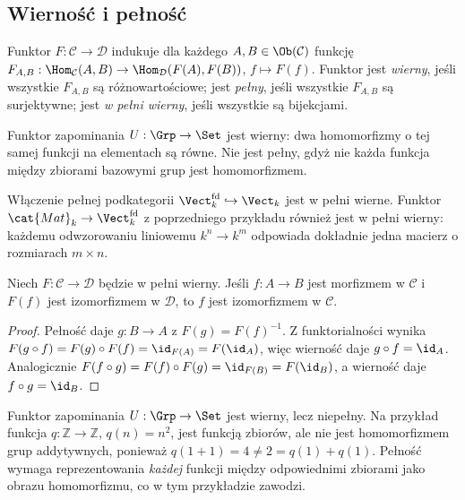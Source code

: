 \subsection{Wierność i pełność}

\begin{definicja}\label{def:pelny}
Funktor $F:\mathcal C\to\mathcal D$ indukuje dla każdego $A,B\in\Ob(\mathcal C)$ funkcję $F_{A,B}:\Hom_{\mathcal C}(A,B)\to\Hom_{\mathcal D}(F(A),F(B))$, $f\mapsto F(f)$. Funktor jest \emph{wierny}, jeśli wszystkie $F_{A,B}$ są różnowartościowe; jest \emph{pełny}, jeśli wszystkie $F_{A,B}$ są surjektywne; jest \emph{w pełni wierny}, jeśli wszystkie są bijekcjami.
\end{definicja}

\begin{przyklad}
Funktor zapominania $U:\Grp\to\Set$ jest wierny: dwa homomorfizmy o tej samej funkcji na elementach są równe. Nie jest pełny, gdyż nie każda funkcja między zbiorami bazowymi grup jest homomorfizmem.
\end{przyklad}

\begin{przyklad}
Włączenie pełnej podkategorii $\Vect_k^{\mathrm{fd}}\hookrightarrow\Vect_k$ jest w pełni wierne. Funktor $\cat{Mat}_k\to\Vect_k^{\mathrm{fd}}$ z poprzedniego przykładu również jest w pełni wierny: każdemu odwzorowaniu liniowemu $k^n\to k^m$ odpowiada dokładnie jedna macierz o rozmiarach $m\times n$.
\end{przyklad}


\begin{stwierdzenie}\label{tw:ff-reflect-iso}
Niech $F:\mathcal C\to\mathcal D$ będzie w pełni wierny. Jeśli $f:A\to B$ jest morfizmem w $\mathcal C$ i $F(f)$ jest izomorfizmem w $\mathcal D$, to $f$ jest izomorfizmem w $\mathcal C$.
\end{stwierdzenie}
\begin{proof}
Pełność daje $g:B\to A$ z $F(g)=F(f)^{-1}$. Z funktorialności wynika $F(g\circ f)=F(g)\circ F(f)=\id_{F(A)}=F(\id_A)$, więc wierność daje $g\circ f=\id_A$. Analogicznie $F(f\circ g)=F(f)\circ F(g)=\id_{F(B)}=F(\id_B)$, a wierność daje $f\circ g=\id_B$.
\end{proof}

\begin{przyklad}
Funktor zapominania $U:\Grp\to\Set$ jest wierny, lecz niepełny. Na przykład funkcja $q:\mathbb Z\to\mathbb Z$, $q(n)=n^2$, jest funkcją zbiorów, ale nie jest homomorfizmem grup addytywnych, ponieważ $q(1+1)=4\neq 2=q(1)+q(1)$. Pełność wymaga reprezentowania \emph{każdej} funkcji między odpowiednimi zbiorami jako obrazu homomorfizmu, co w tym przykładzie zawodzi.
\end{przyklad}


